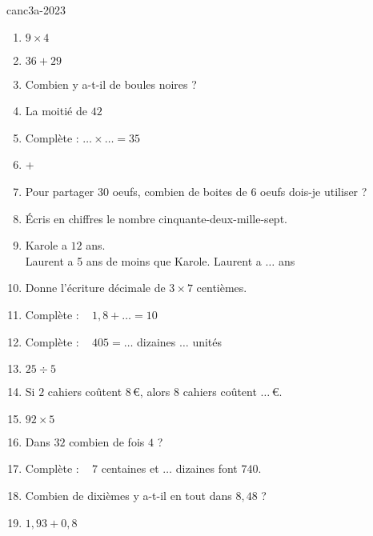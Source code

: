 \begin{EXO}{}{canc3a-2023}

    

\begin{enumerate}[itemsep=1em, label=\arabic*)]
	\item {}$9 \times 4$
	\item {}$36+29$
	\item {}Combien y a-t-il de boules noires ? \\ 

	\item {}La moitié de $42$
	\item {}Complète :  $\ldots \times \ldots =35$
	\item {}+ 
	\item {}Pour partager $30$ oeufs, combien de boites de  $6$ oeufs dois-je utiliser ? 
	\item {}Écris en chiffres le nombre cinquante-deux-mille-sept.
	\item {}Karole a $12$ ans. \\         Laurent a 5 ans de moins que Karole. Laurent a $\ldots$ ans
	\item {}Donne l'écriture décimale de  $3\times 7$ centièmes.
	\item {}Complète : \,\,\,  $1{,}8+\ldots =10$ 
	\item {}Complète : \,\,\,  $405= \ldots$ dizaines  $\ldots$  unités
	\item {}$25\div 5$
	\item {}Si $2$ cahiers coûtent $8$\,\euro{}, alors $8$ cahiers coûtent  $\ldots$\,\euro{}.
	\item {}$92\times 5$
	\item {}Dans $32$ combien de fois $4$ ?
	\item {}Complète : \,\,\, $7$ centaines et  $\ldots$  dizaines font  $740$.
	\item {}Combien de dixièmes y a-t-il en tout dans $8{,}48$ ?
	\item {}$1{,}93+ 0{,}8$
\end{enumerate}



\exocorrection



\end{EXO}
